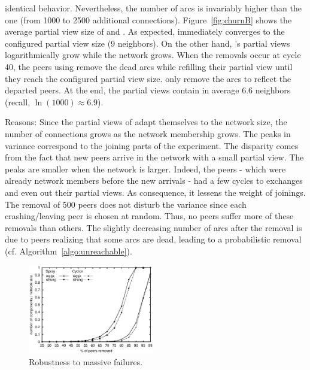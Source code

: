 \begin{asparadesc}
  identical behavior. Nevertheless, the number of arcs is invariably higher
  than the \SPRAY one (from 1000 to 2500 additional
  connections). Figure~\ref{fig:churnB} shows the average partial view size of
  \SPRAY and \CYCLON. As expected, \CYCLON immediately converges to the
  configured partial view size (9 neighbors). On the other hand, \SPRAY's
  partial views logarithmically grow while the network grows. When the removals
  occur at cycle 40, the peers using \CYCLON remove the dead arcs while
  refilling their partial view until they reach the configured partial view
  size. \SPRAY only remove the arcs to reflect the departed peers. At the end,
  the \SPRAY partial views contain in average 6.6 neighbors (recall,
  $\ln(1000)\approx 6.9$).
\item[Reasons:] Since the partial views of \SPRAY adapt themselves to the
  network size, the number of connections grows as the network membership
  grows.  The peaks in variance correspond to the joining parts of the
  experiment. The disparity comes from the fact that new peers arrive in the
  network with a small partial view. The peaks are smaller when the network is
  larger. Indeed, the peers - which were already network members before the new
  arrivals - had a few cycles to exchanges and even out their partial views. As
  consequence, it lessens the weight of joinings. The removal of 500 peers does
  not disturb the variance since each crashing/leaving peer is chosen at
  random. Thus, no peers suffer more of these removals than others. The
  slightly decreasing number of arcs after the removal is due to peers
  realizing that some arcs are dead, leading to a probabilistic removal
  (cf. Algorithm~\ref{algo:unreachable}). 
\end{asparadesc}

\begin{figure}
  \centering
  \includegraphics[width=0.49\textwidth]{img/resilience.eps}
  \caption{\label{fig:resilience}Robustness to massive failures.}
\end{figure}

